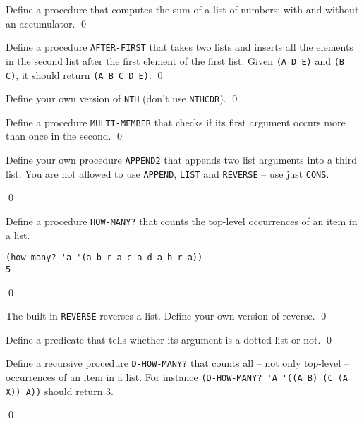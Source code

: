\documentclass[a4paper,11pt]{article}
\begin{document}
\noindent\hrulefill

\begin{uexercise}
Define a procedure that computes the sum of a list of numbers; with and without an accumulator.
\qed
\end{uexercise}

\begin{uexercise}
Define a procedure \Verb+AFTER-FIRST+ that takes two lists and inserts all the elements in the second list after the first element of the first list. Given \Verb+(A D E)+ and \Verb+(B C)+, it should return \Verb+(A B C D E)+.
\qed
\end{uexercise}

\begin{uexercise}
Define your own version of \Verb+NTH+ (don't use \Verb+NTHCDR+).
\qed
\end{uexercise}

\begin{uexercise}
Define a procedure \Verb+MULTI-MEMBER+ that checks if its first argument occurs more than once in the second.
\qed
\end{uexercise}

\begin{uexercise}
Define your own procedure \Verb+APPEND2+ that appends two list arguments into a third list. You are not allowed to use \Verb+APPEND+, \Verb+LIST+ and \Verb+REVERSE+ -- use just \Verb+CONS+.

\qed
\end{uexercise}

\begin{uexercise}

Define a procedure \Verb+HOW-MANY?+ that counts the top-level occurrences of an item in a list.

\begin{Verbatim}
(how-many? 'a '(a b r a c a d a b r a))
5
\end{Verbatim}
\qed
\end{uexercise}

\begin{uexercise}
\label{reverse}
The built-in \Verb+REVERSE+ reverses a list. Define your own version of reverse.
\qed
\end{uexercise}

\begin{uexercise}
Define a predicate that tells whether its argument is a dotted list or not.
\qed
\end{uexercise}

\begin{uexercise}
Define a recursive procedure \Verb+D-HOW-MANY?+ that counts all – not only top-level – occurrences of an item in a list. For instance \Verb+(D-HOW-MANY? 'A '((A B) (C (A X)) A))+ should return 3. 

\qed
\end{uexercise}
\end{document}
